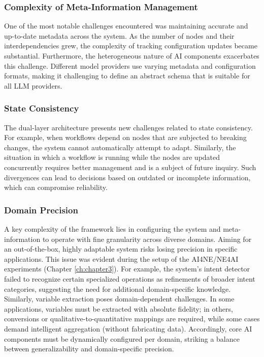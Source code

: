\subsubsection{Complexity of Meta-Information Management}
One of the most notable challenges encountered was maintaining accurate and up-to-date metadata across the system. As the number of nodes and their interdependencies grew, the complexity of tracking configuration updates became substantial. Furthermore, the heterogeneous nature of AI components exacerbates this challenge. Different model providers use varying metadata and configuration formats, making it challenging to define an abstract schema that is suitable for all LLM providers.

\subsubsection{State Consistency}
The dual-layer architecture presents new challenges related to state consistency. For example, when workflows depend on nodes that are subjected to breaking changes, the system cannot automatically attempt to adapt. Similarly, the situation in which a workflow is running while the nodes are updated concurrently requires better management and is a subject of future inquiry. Such divergences can lead to decisions based on outdated or incomplete information, which can compromise reliability.

\subsubsection{Domain Precision}
A key complexity of the framework lies in configuring the system and meta-information to operate with fine granularity across diverse domains. Aiming for an out-of-the-box, highly adaptable system risks losing precision in specific applications. This issue was evident during the setup of the AI4NE/NE4AI experiments (Chapter \ref{ch:chapter3}). For example, the system's intent detector failed to recognize certain specialized operations as refinements of broader intent categories, suggesting the need for additional domain-specific knowledge. Similarly, variable extraction poses domain-dependent challenges. In some applications, variables must be extracted with absolute fidelity; in others, conversions or qualitative-to-quantitative mappings are required, while some cases demand intelligent aggregation (without fabricating data). Accordingly, core AI components must be dynamically configured per domain, striking a balance between generalizability and domain-specific precision.


